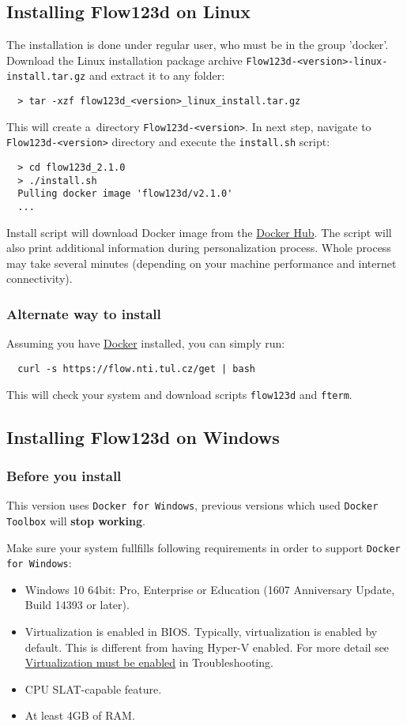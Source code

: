 \subsection{Installing Flow123d on Linux}
The installation is done under regular user, who must be in the group 'docker'.
Download the Linux installation package archive \verb'Flow123d-<version>-linux-install.tar.gz' and extract it to any folder:
\begin{verbatim}
  > tar -xzf flow123d_<version>_linux_install.tar.gz
\end{verbatim}
This will create a~directory \verb'Flow123d-<version>'. In next step, navigate to \verb'Flow123d-<version>' directory
and execute the \verb'install.sh' script:
\begin{verbatim}
  > cd flow123d_2.1.0
  > ./install.sh
  Pulling docker image 'flow123d/v2.1.0'
  ...
\end{verbatim}
Install script will download Docker image from the \href{https://hub.docker.com/u/flow123d}{Docker Hub}. The script will also print
additional information during personalization process. Whole process may take several minutes (depending on your machine performance and internet connectivity).


\subsubsection{Alternate way to install}
Assuming you have \href{https://www.docker.com}{Docker} installed, you can simply run:
\begin{verbatim}
  curl -s https://flow.nti.tul.cz/get | bash
\end{verbatim}
This will check your system and download scripts \verb'flow123d' and \verb'fterm'.


\subsection{Installing Flow123d on Windows}
\subsubsection{Before you install}

This version uses \verb'Docker for Windows', previous versions which used \verb'Docker Toolbox' will \textbf{stop working}.

Make sure your system fullfills following requirements in order to support \verb'Docker for Windows':
\begin{itemize}
    \item Windows 10 64bit: Pro, Enterprise or Education (1607 Anniversary Update, Build 14393 or later).
    \item Virtualization is enabled in BIOS. Typically, virtualization is enabled by default. This is different from having Hyper-V enabled. For more detail see \href{https://docs.docker.com/docker-for-windows/troubleshoot/#virtualization-must-be-enabled}{Virtualization must be enabled} in Troubleshooting.
    \item CPU SLAT-capable feature.
    \item At least 4GB of RAM.
\end{itemize}


